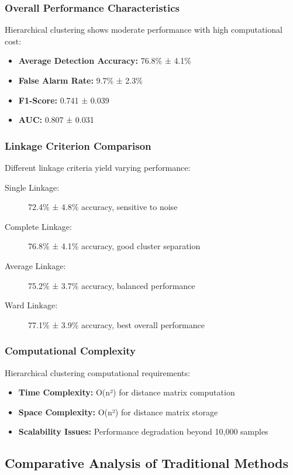 \subsubsection{Overall Performance Characteristics}
Hierarchical clustering shows moderate performance with high computational cost:
\begin{itemize}
\item \textbf{Average Detection Accuracy:} 76.8\% ± 4.1\%
\item \textbf{False Alarm Rate:} 9.7\% ± 2.3\%
\item \textbf{F1-Score:} 0.741 ± 0.039
\item \textbf{AUC:} 0.807 ± 0.031
\end{itemize}

\subsubsection{Linkage Criterion Comparison}
Different linkage criteria yield varying performance:
\begin{description}
\item[Single Linkage:] 72.4\% ± 4.8\% accuracy, sensitive to noise
\item[Complete Linkage:] 76.8\% ± 4.1\% accuracy, good cluster separation
\item [Average Linkage:] 75.2\% ± 3.7\% accuracy, balanced performance
\item[Ward Linkage:] 77.1\% ± 3.9\% accuracy, best overall performance
\end{description}

\subsubsection{Computational Complexity}
Hierarchical clustering computational requirements:
\begin{itemize}
\item \textbf{Time Complexity:} O(n²) for distance matrix computation
\item \textbf{Space Complexity:} O(n²) for distance matrix storage
\item \textbf{Scalability Issues:} Performance degradation beyond 10,000 samples
\end{itemize}

\subsection{Comparative Analysis of Traditional Methods}

